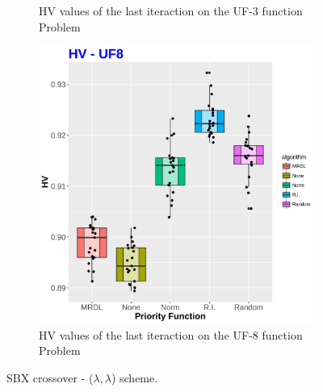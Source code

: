 \begin{figure}[!t]
\begin{subfigure}[b]{0.33\textwidth}
	\caption{HV values of the last iteraction on the UF-3 function Problem}
	\end{subfigure}
	\begin{subfigure}[b]{0.33\textwidth}
		\centering
	\includegraphics[width=1\textwidth, height=1\textwidth]{images/UF8_HV}
	\caption{HV values of the last iteraction on the UF-8 function Problem}
	\end{subfigure}
	\caption{SBX crossover - ($\lambda, \lambda$) scheme.}
		\label{HVS}
\end{figure}

